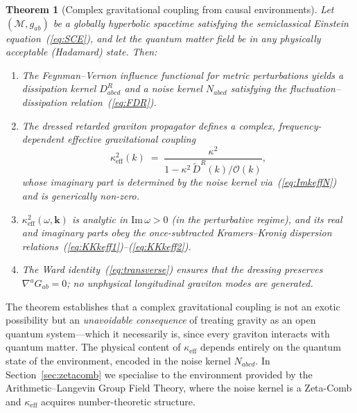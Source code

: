 \documentclass[12pt,a4paper]{article}
\newtheorem{theorem}{Theorem}
\begin{document}
\begin{theorem}[Complex gravitational coupling from causal environments]\label{thm:main}
Let $(\mathcal{M},g_{ab})$ be a globally hyperbolic spacetime satisfying the semiclassical Einstein equation~\textup{(\ref{eq:SCE})}, and let the quantum matter field be in any physically acceptable \textup{(Hadamard)} state.
Then:
\begin{enumerate}
\item[\textup{(a)}]
The Feynman--Vernon influence functional for metric perturbations yields a dissipation kernel $D^{R}_{abcd}$ and a noise kernel $N_{abcd}$ satisfying the fluctuation--dissipation relation~\textup{(\ref{eq:FDR})}.
\item[\textup{(b)}]
The dressed retarded graviton propagator defines a complex, frequency-dependent effective gravitational coupling
\begin{equation}\label{eq:keffthm}
  \kappa_{\mathrm{eff}}^{2}(k)
  \;=\;
  \frac{\kappa^{2}}{1-\kappa^{2}\,\tilde{D}^{R}(k)/\mathcal{O}(k)},
\end{equation}
whose imaginary part is determined by the noise kernel via~\textup{(\ref{eq:ImkeffN})} and is generically non-zero.
\item[\textup{(c)}]
$\kappa_{\mathrm{eff}}^{2}(\omega,\mathbf{k})$ is analytic in $\mathrm{Im}\,\omega>0$ \textup{(}in the perturbative regime\textup{)}, and its real and imaginary parts obey the once-subtracted Kramers--Kronig dispersion relations~\textup{(\ref{eq:KKkeff1})}--\textup{(\ref{eq:KKkeff2})}.
\item[\textup{(d)}]
The Ward identity~\textup{(\ref{eq:transverse})} ensures that the dressing preserves $\nabla^{a}G_{ab}=0$; no unphysical longitudinal graviton modes are generated.
\end{enumerate}
\end{theorem}

\noindent
The theorem establishes that a complex gravitational coupling is not an exotic possibility but an \emph{unavoidable consequence} of treating gravity as an open quantum system---which it necessarily is, since every graviton interacts with quantum matter.
The physical content of $\kappa_{\mathrm{eff}}$ depends entirely on the quantum state of the environment, encoded in the noise kernel $N_{abcd}$.
In Section~\ref{sec:zetacomb} we specialise to the environment provided by the Arithmetic--Langevin Group Field Theory, where the noise kernel is a Zeta-Comb and $\kappa_{\mathrm{eff}}$ acquires number-theoretic structure.
\end{document}

